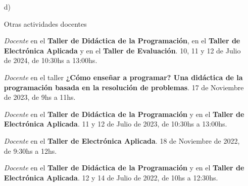 \begin{enumerate}[leftmargin=0.8cm]
{\begin{itemize}[leftmargin=0.2cm]
      {CeFIEC - FCEyN - UBA}
      {Durante Marzo de 2017. 2 horas.}

    \end{itemize}
  }

  \item[d)]{Otras actividades docentes

    \begin{itemize}[leftmargin=0.2cm]

      {\emph{Docente} en el \textbf{Taller de Didáctica de la Programación}, en el \textbf{Taller de Electrónica Aplicada} y en el \textbf{Taller de Evaluación}.}
      {10, 11 y 12 de Julio de 2024, de 10:30hs a 13:00hs.}

      {\emph{Docente} en el taller \textbf{¿Cómo enseñar a programar? Una didáctica de la programación basada en la resolución de problemas}.}
      {17 de Noviembre de 2023, de 9hs a 11hs.}

      {\emph{Docente} en el \textbf{Taller de Didáctica de la Programación} y en el \textbf{Taller de Electrónica Aplicada}.}
      {11 y 12 de Julio de 2023, de 10:30hs a 13:00hs.}

      {\emph{Docente} en el \textbf{Taller de Electrónica Aplicada}.}
      {18 de Noviembre de 2022, de 9:30hs a 12hs.}

      {\emph{Docente} en el \textbf{Taller de Didáctica de la Programación} y en el \textbf{Taller de Electrónica Aplicada}.}
      {12 y 14 de Julio de 2022, de 10hs a 12:30hs.}


\end{itemize}}
\end{enumerate}
